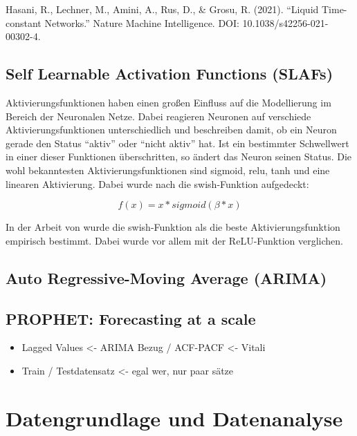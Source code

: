 \documentclass[11pt,ngerman,a4paper,]{article}
\providecommand{\tightlist}{%
  \setlength{\itemsep}{0pt}\setlength{\parskip}{0pt}}
\begin{document}
Hasani, R., Lechner, M., Amini, A., Rus, D., \& Grosu, R. (2021). ``Liquid Time-constant Networks.'' Nature Machine Intelligence. DOI: 10.1038/s42256-021-00302-4.

\subsection{Self Learnable Activation Functions (SLAFs)}\label{self-learnable-activation-functions-slafs}

Aktivierungsfunktionen haben einen großen Einfluss auf die Modellierung im Bereich der Neuronalen Netze. Dabei reagieren Neuronen auf verschiede Aktivierungsfunktionen unterschiedlich und beschreiben damit, ob ein Neuron gerade den Status ``aktiv'' oder ``nicht aktiv'' hat. Ist ein bestimmter Schwellwert in einer dieser Funktionen überschritten, so ändert das Neuron seinen Status. Die wohl bekanntesten Aktivierungsfunktionen sind sigmoid, relu, tanh und eine linearen Aktivierung. Dabei wurde nach \cite{Ramachandran2017} die swish-Funktion aufgedeckt:

\[
f(x) = x * sigmoid(\beta * x)
\]

In der Arbeit von \cite{Ramachandran2017} wurde die swish-Funktion als die beste Aktivierungsfunktion empirisch bestimmt. Dabei wurde vor allem mit der ReLU-Funktion verglichen.

\subsection{Auto Regressive-Moving Average (ARIMA)}\label{auto-regressive-moving-average-arima}

\subsection{PROPHET: Forecasting at a scale}\label{prophet-forecasting-at-a-scale}

\begin{itemize}
\tightlist
\item
  Lagged Values \textless- ARIMA Bezug / ACF-PACF \textless- Vitali
\item
  Train / Testdatensatz \textless- egal wer, nur paar sätze
\end{itemize}

\section{Datengrundlage und Datenanalyse}\label{datengrundlage-und-datenanalyse}
\end{document}

